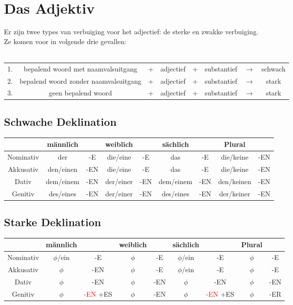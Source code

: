 \documentclass[main.tex]{subfiles}
\begin{document}
\chapter{Das Adjektiv}
Er zijn twee types van verbuiging voor het adjectief: de sterke en zwakke verbuiging.\\
Ze komen voor in volgende drie gevallen:
\\
\\
\bgroup
\def\arraystretch{1.5}
\begin{tabular}{cccccccc}
1. & bepalend woord met naamvalsuitgang & + & adjectief & + & substantief & $\rightarrow$ & schwach \\ 

2. & bepalend woord zonder naamvalsuitgang & + & adjectief & + & substantief & $\rightarrow$ & stark \\

3. & geen bepalend woord & + & adjectief & + & substantief & $\rightarrow$ & stark \\ 
\end{tabular} 
\egroup

\section{Schwache Deklination}
\begin{tabular}{|c|c|c|c|c|c|c|c|c|}
\hline 
\rowcolor{gray}
  & männlich &  & weiblich &  & sächlich &  & Plural &  \\ 
\hline 
\cellcolor[gray]{0.8}Nominativ & der & -E & die/eine & -E & das & -E & die/keine & -EN \\ 
\hline 
\cellcolor[gray]{0.8}Akkusativ & den/einen & -EN & die/eine & -E & das & -E & die/keine & -EN \\ 
\hline 
\cellcolor[gray]{0.8}Dativ & dem/einem & -EN & der/einer & -EN & dem/einem & -EN & den/keinen & -EN \\ 
\hline 
\cellcolor[gray]{0.8}Genitiv & des/eines & -EN & der/einer & -EN & des/eines & -EN & der/keiner & -EN \\ 
\hline 
\end{tabular} 
\section{Starke Deklination}
\begin{tabular}{|c|c|c|c|c|c|c|c|c|}
\hline 
\rowcolor{gray}
  & männlich &  & weiblich &  & sächlich &  & Plural &  \\ 
\hline 
\cellcolor[gray]{0.8}Nominativ & $\phi$/ein & -E & $\phi$ & -E & $\phi$/ein & -E & $\phi$ & -E \\ 
\hline 
\cellcolor[gray]{0.8}Akkusativ & $\phi$ & -EN & $\phi$ & -E & $\phi$/ein & -E & $\phi$ & -E \\ 
\hline 
\cellcolor[gray]{0.8}Dativ & $\phi$ & -EN & $\phi$ & -EN & $\phi$ & -EN & $\phi$ & -EN \\ 
\hline 
\cellcolor[gray]{0.8}Genitiv & $\phi$ & \textcolor{red}{-EN} +ES & $\phi$ & -EN & $\phi$ & \textcolor{red}{-EN} +ES & $\phi$ & -ER \\ 
\hline 
\end{tabular} 
\end{document}
